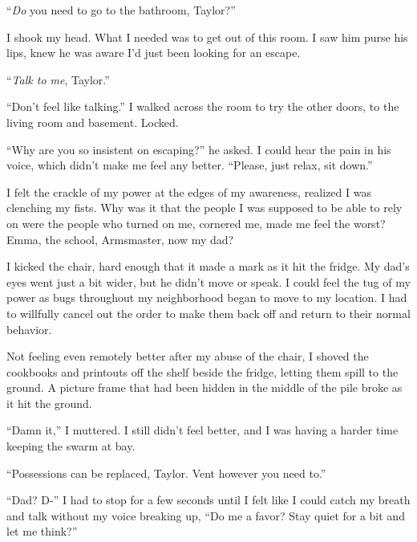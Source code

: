 ``\emph{Do} you need to go to the bathroom, Taylor?''



I shook my head.  What I needed was to get out of this room.  I saw him purse his lips, knew he was aware I'd just been looking for an escape.



``\emph{Talk to me}, Taylor.''



``Don't feel like talking.''  I walked across the room to try the other doors, to the living room and basement.  Locked.



``Why are you so insistent on escaping?'' he asked.  I could hear the pain in his voice, which didn't make me feel any better.  ``Please, just relax, sit down.''



I felt the crackle of my power at the edges of my awareness, realized I was clenching my fists.  Why was it that the people I was supposed to be able to rely on were the people who turned on me, cornered me, made me feel the worst?  Emma, the school, Armsmaster, now my dad?



I kicked the chair, hard enough that it made a mark as it hit the fridge.  My dad's eyes went just a bit wider, but he didn't move or speak.  I could feel the tug of my power as bugs throughout my neighborhood began to move to my location.  I had to willfully cancel out the order to make them back off and return to their normal behavior.



Not feeling even remotely better after my abuse of the chair, I shoved the cookbooks and printouts off the shelf beside the fridge, letting them spill to the ground.  A picture frame that had been hidden in the middle of the pile broke as it hit the ground.



``Damn it,'' I muttered.  I still didn't feel better, and I was having a harder time keeping the swarm at bay.



``Possessions can be replaced, Taylor.  Vent however you need to.''



``Dad?  D-'' I had to stop for a few seconds until I felt like I could catch my breath and talk without my voice breaking up, ``Do me a favor?  Stay quiet for a bit and let me think?''



